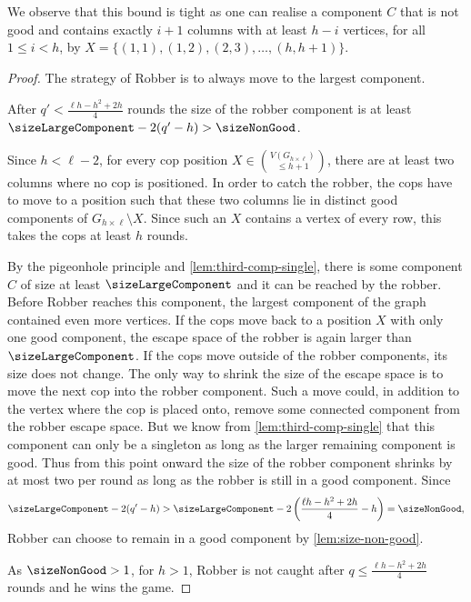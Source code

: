 \documentclass[a4paper,UKenglish,cleveref, autoref, thm-restate]{lipics-v2021}
\newcommand{\grid}[2]{\ensuremath{G_{#1 \times #2}}}
\begin{document}
We observe that this bound is tight as one can realise a component $C$ that is not good and contains exactly $i+1$ columns with at least $h-i$ vertices, for all $1\leq i<h$, by $X=\{(1,1),(1,2),(2,3),\ldots,(h,h+1)\}$.

\lowerBoundRounds*

\begin{proof}The strategy of Robber is to always move to the largest component.
	\begin{claim}
		After $q'< \frac{\ell h - h^2 + 2h}{4}$ rounds the size of the robber component is at least $\sizeLargeComponent-2(q'-h) > \sizeNonGood$.
	\end{claim}
	\begin{claimproof}
		Since $h < \ell-2$, for every cop position $X\in \binom{V(\grid{h}{\ell})}{\leq h+1}$, there are at least two columns where no cop is positioned.
		In order to catch the robber, the cops have to move to a position such that these two columns lie in distinct good components of  $\grid{h}{\ell}\setminus X$.
		Since such an $X$ contains a vertex of every row, this takes the cops at least $h$ rounds.
		
		By the pigeonhole principle and \cref{lem:third-comp-single}, there is some component $C$ of size at least $\sizeLargeComponent$ and it can be reached by the robber.
		Before Robber reaches this component, the largest component of the graph contained even more vertices.
		If the cops move back to a position $X$ with only one good component, the escape space of the robber is again larger than $\sizeLargeComponent$.
		If the cops move outside of the robber components, its size does not change.
		The only way to shrink the size of the escape space is to move the next cop into the robber component.
		Such a move could, in addition to the vertex where the cop is placed onto, remove some connected component from the robber escape space.
		But we know from \cref{lem:third-comp-single} that this component can only be a singleton as long as the larger remaining component is good.
		Thus from this point onward the size of the robber component shrinks by at most two per round as long as the robber is still in a good component.
		Since 
		\begin{equation*}
		\sizeLargeComponent - 2(q' - h)> \sizeLargeComponent -2\left(\frac{\ell h - h^2 + 2h}{4} - h\right) = \sizeNonGood,
		\end{equation*}
		Robber can choose to remain in a good component by \cref{lem:size-non-good}.
	\end{claimproof}
	As $\sizeNonGood>1$, for $h>1$, Robber is not caught after $q\leq \frac{\ell h - h^2 + 2h}{4}$ rounds and he wins the game.
\end{proof}
\end{document}
